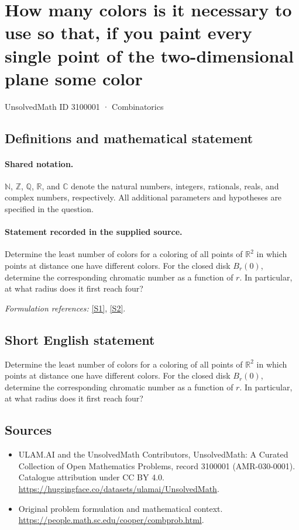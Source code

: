 \documentclass[11pt]{article}
\newcommand{\sref}[2]{\hyperlink{source:#1:#2}{[S#2]}}
\begin{document}
\setcounter{section}{3100000}
\section{How many colors is it necessary to use so that, if you paint every single point of the two-dimensional plane some color}\label{3100001}
{\small UnsolvedMath ID 3100001 · Combinatorics}
\subsection{Definitions and mathematical statement}

\paragraph{Shared notation.}$\mathbb N$, $\mathbb Z$, $\mathbb Q$, $\mathbb R$, and $\mathbb C$ denote the natural numbers, integers, rationals, reals, and complex numbers, respectively. All additional parameters and hypotheses are specified in the question.


\paragraph{Statement recorded in the supplied source.}
Determine the least number of colors for a coloring of all points of $\mathbb R^2$ in which points at distance one have different colors. For the closed disk $B_r(0)$, determine the corresponding chromatic number as a function of $r$. In particular, at what radius does it first reach four?
\par\smallskip\textit{Formulation references:} \sref{3100001}{1}, \sref{3100001}{2}.
\subsection{Short English statement}
Determine the least number of colors for a coloring of all points of $\mathbb R^2$ in which points at distance one have different colors. For the closed disk $B_r(0)$, determine the corresponding chromatic number as a function of $r$. In particular, at what radius does it first reach four?
\subsection{Sources}
\begin{itemize}
\item[\hypertarget{source:3100001:1}{S1}] ULAM.AI and the UnsolvedMath Contributors, UnsolvedMath: A Curated Collection of Open Mathematics Problems, record 3100001 (AMR-030-0001). Catalogue attribution under CC BY 4.0.
\url{https://huggingface.co/datasets/ulamai/UnsolvedMath}.
\item[\hypertarget{source:3100001:2}{S2}] Original problem formulation and mathematical context.
\url{https://people.math.sc.edu/cooper/combprob.html}.
\end{itemize}
\label{end:3100001}
\end{document}
